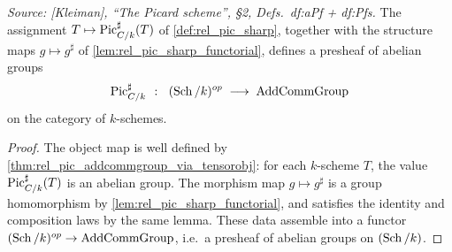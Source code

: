 \begin{theorem}\leanok
  \label{thm:rel_pic_sharp_presheaf}

  \textit{Source: [Kleiman], ``The Picard scheme'', \S 2,
  Defs.~df:aPf + df:Pfs.}
  The assignment \(T \mapsto \operatorname{Pic}^\sharp_{C/k}(T)\) of \cref{def:rel_pic_sharp},
  together with the structure maps \(g \mapsto g^\sharp\) of
  \cref{lem:rel_pic_sharp_functorial}, defines a presheaf of abelian groups
  \[
    \operatorname{Pic}^\sharp_{C/k} \;\;\colon\;\; (\operatorname{Sch}/k)^{op} \;\longrightarrow\;
                                     \mathrm{AddCommGroup}
  \]
  on the category of \(k\)-schemes.
\end{theorem}

\begin{proof}




\leanok
  The object map is well defined by
  \cref{thm:rel_pic_addcommgroup_via_tensorobj}: for each \(k\)-scheme
  \(T\), the value \(\operatorname{Pic}^\sharp_{C/k}(T)\) is an abelian group. The
  morphism map \(g \mapsto g^\sharp\) is a group homomorphism by
  \cref{lem:rel_pic_sharp_functorial}, and satisfies the identity and
  composition laws by the same lemma. These data assemble into a functor
  \((\operatorname{Sch}/k)^{op} \to \mathrm{AddCommGroup}\), i.e.\ a presheaf of abelian groups on
  \((\operatorname{Sch}/k)\).
\end{proof}

